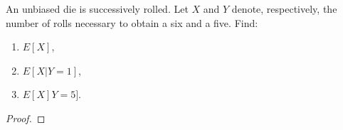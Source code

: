\begin{problem}{3.8}
  An unbiased die is successively rolled. Let $X$ and $Y$ denote, respectively, the number
  of rolls necessary to obtain a six and a five. Find:
  \begin{enumerate}
    \item $E[X]$,
    \item $E[X|Y=1]$,
    \item $E[X]Y=5]$.
  \end{enumerate}
\end{problem}

\begin{proof}
\end{proof}
\newpage
